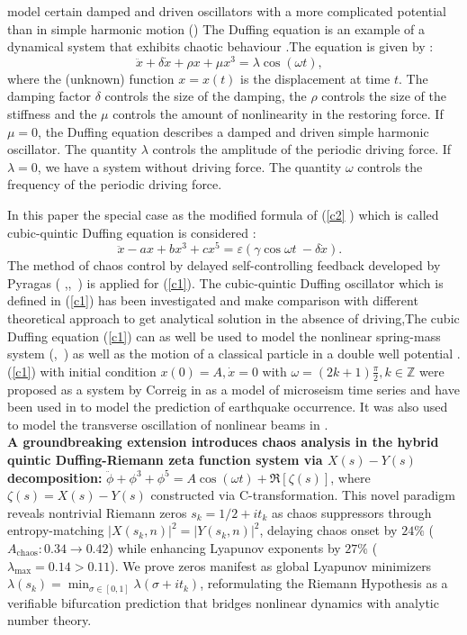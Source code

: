 \documentclass{ws-ijbc}
\begin{document}
model certain damped and driven oscillators with a more complicated
potential than in simple harmonic motion  (\cite{Holmes79})
The Duffing equation is an example of a
dynamical system that exhibits chaotic behaviour \cite{P22}.The equation is given by : 
\begin{equation}
\ddot{x}+\delta \dot{x}+\rho x+\mu x^{3}=\lambda \cos (\omega t),\text{ }
\label{c2}
\end{equation}%
where the (unknown) function $x=x(t)$ is the displacement at time $t$. The
damping factor $\delta $ controls the size of the damping, the $\rho $
controls the size of the stiffness and the $\mu $ controls the amount of
nonlinearity in the restoring force. If $\mu =0$, the Duffing equation
describes a damped and driven simple harmonic oscillator. The quantity $%
\lambda $ controls the amplitude of the periodic driving force. If $\lambda
=0$, we have a system without driving force. The quantity $\omega $ controls
the frequency of the periodic driving force.\cite{G76}

\noindent In this paper the special case as the modified formula of (\ref{c2}%
) which is called cubic-quintic Duffing equation \cite{A Elías13} is considered :
\begin{equation}
\ddot{x}-ax+bx^{3}+cx^{5}=\varepsilon (\gamma \cos \omega t\ -\delta \dot{x}%
).\text{ }  \label{c1}
\end{equation}%
The method of chaos control by delayed self-controlling feedback developed
by Pyragas (\cite{Pyragas92} ,\cite{Pyragas96},~\cite{Pyragas2001}) is applied for (\ref{c1}). The cubic-quintic
Duffing oscillator which is defined in (\ref{c1}) has been investigated and make comparison with different
theoretical approach to get analytical solution in the absence of driving\cite{El-Dib022},The cubic Duffing equation (\ref{c1}) can as well be used to model the nonlinear spring-mass system (\cite{Nayfa73},~\cite{Amazigo11}) as well as the motion of a classical particle in a double well potential\cite{G78} . (\ref{c1}) with initial condition $x(0)=A,\dot{x}=0$ with $\omega=(2k+1)\frac{\pi}{2},k\in \mathbb{Z}$  were proposed as a system  by Correig in \cite{A. M. Correig62} as a model of microseism time series and have been used in \cite{M. O. Oyesanya63}to model the prediction of earthquake occurrence. It was also used to model the transverse oscillation of nonlinear beams in  \cite{H. M. Sedighi64}.\\

\noindent \textbf{A groundbreaking extension introduces chaos analysis in the hybrid quintic Duffing-Riemann zeta function system via $X(s)-Y(s)$ decomposition:} $\ddot{\phi}+\phi^3+\phi^5=A\cos(\omega t)+\Re[\zeta(s)]$, where $\zeta(s)=X(s)-Y(s)$ constructed via C-transformation. This novel paradigm reveals nontrivial Riemann zeros $s_k=1/2+it_k$ as chaos suppressors through entropy-matching $|X(s_k,n)|^2=|Y(s_k,n)|^2$, delaying chaos onset by $24\%$ ($A_\text{chaos}:0.34\to0.42$) while enhancing Lyapunov exponents by $27\%$ ($\lambda_\text{max}=0.14>0.11$). We prove zeros manifest as global Lyapunov minimizers $\lambda(s_k)=\min_{\sigma\in[0,1]}\lambda(\sigma+it_k)$, reformulating the Riemann Hypothesis as a verifiable bifurcation prediction that bridges nonlinear dynamics with analytic number theory.
\end{document}
